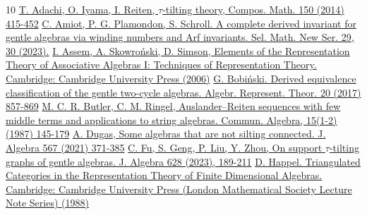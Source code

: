 \documentclass[11pt,reqno]{amsart}
\theoremstyle{plain}
\theoremstyle{definition}
\theoremstyle{remark}
\numberwithin{equation}{section}
\begin{document}


\begin{thebibliography}{10}
 \href{https://www.cambridge.org/core/journals/compositio-mathematica/article/abs/tau-tilting-theory/A93966859BAAEC2B286AC46AB3839740}{T. Adachi, O. Iyama, I. Reiten, $\tau$-tilting theory, Compos. Math. 150 (2014) 415-452}
 \href{https://link.springer.com/article/10.1007/s00029-022-00822-x}{C. Amiot, P. G. Plamondon, S. Schroll. A complete derived invariant for gentle algebras via winding numbers and Arf invariants. Sel. Math. New Ser. 29, 30 (2023).}
 \href{https://www.cambridge.org/core/books/elements-of-the-representation-theory-of-associative-algebras/AA8066B5809D0F556A540400AD3A419C}{I. Assem, A. Skowro\'{n}ski, D. Simson, Elements of the Representation Theory of Associative Algebras I: Techniques of Representation Theory. Cambridge: Cambridge University Press (2006)}
 \href{https://link.springer.com/article/10.1007/s10468-016-9666-8}{G. Bobi\'{n}ski. Derived equivalence classification of the gentle two-cycle algebras. Algebr. Represent. Theor. 20 (2017) 857-869}
 \href{https://www.tandfonline.com/doi/abs/10.1080/00927878708823416}{M. C. R. Butler, C. M. Ringel, Auslander--Reiten sequences with few middle terms and applications to string algebras. Commun. Algebra, 15(1-2) (1987) 145-179}
 \href{https://www.sciencedirect.com/science/article/pii/S0021869320304890}{A. Dugas, Some algebras that are not silting connected. J. Algebra 567 (2021) 371-385}
 \href{https://www.sciencedirect.com/science/article/pii/S0021869323001187}{C. Fu, S. Geng, P. Liu, Y. Zhou, On support $\tau$-tilting graphs of gentle algebras. J. Algebra 628 (2023), 189-211}
 \href{https://www.cambridge.org/core/books/triangulated-categories-in-the-representation-of-finite-dimensional-algebras/8B27A25C1ACEFD54EBD51306AFC3BADC}{D. Happel. Triangulated Categories in the Representation Theory of Finite Dimensional Algebras. Cambridge: Cambridge University Press (London Mathematical Society Lecture Note Series) (1988)}

\end{thebibliography}
\end{document}
